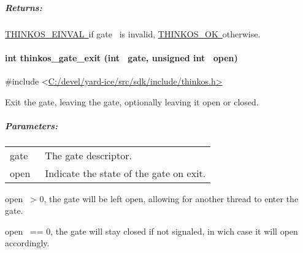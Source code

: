 {\subparagraph{\texorpdfstring{{Returns:}}{Returns:}}\label{returns-48}

{\protect\hyperlink{h.1tuee74}{THINKOS\_EINVAL}}{\protect\hyperlink{h.1tuee74}{~}}{if
}{gate}{~ is invalid,
}{\protect\hyperlink{h.2fk6b3p}{THINKOS\_OK}}{\protect\hyperlink{h.2fk6b3p}{~}}{otherwise.
}

\paragraph{\texorpdfstring{{int thinkos\_gate\_exit (int ~gate, unsigned
int
~open)}}{int thinkos\_gate\_exit (int ~gate, unsigned int ~open)}}\label{int-thinkos_gate_exit-int-gate-unsigned-int-open}

{}

{\#include
\textless{}}{\protect\hyperlink{h.pkwqa1}{C:/devel/yard-ice/src/sdk/include/thinkos.h}}{\protect\hyperlink{h.pkwqa1}{\textgreater{}}}

{Exit the gate, leaving the gate, optionally leaving it open or closed.
}

{}

\subparagraph{\texorpdfstring{{Parameters:}}{Parameters:}}\label{parameters-47}

\protect\hypertarget{t.ed499f740a0883130710bbb983d50c5a5eccdc42}{}{}\protect\hypertarget{t.47}{}{}

\begin{longtable}[]{@{}ll@{}}
\toprule
\begin{minipage}[t]{0.47\columnwidth}\raggedright\strut
{gate}{~}\strut
\end{minipage} & \begin{minipage}[t]{0.47\columnwidth}\raggedright\strut
{The gate descriptor. }\strut
\end{minipage}\tabularnewline
\begin{minipage}[t]{0.47\columnwidth}\raggedright\strut
{open}{~}\strut
\end{minipage} & \begin{minipage}[t]{0.47\columnwidth}\raggedright\strut
{Indicate the state of the gate on exit.}\strut
\end{minipage}\tabularnewline
\bottomrule
\end{longtable}

{open}{~ \textgreater{} 0, the gate will be left open, allowing for
another thread to enter the gate.}

{open}{~ == 0, the gate will stay closed if not signaled, in wich case
it will open accordingly. }

}
